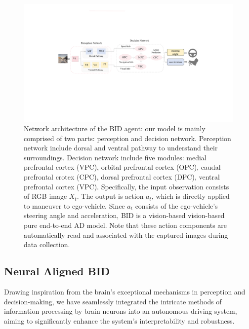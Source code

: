 \begin{figure}[t]
	\centering
	\includegraphics[width=\linewidth]{fig/net.pdf}
	\caption{Network architecture of the BID agent:
	our model is mainly comprised of two parts: perception and decision network.
	Perception network include dorsal and ventral pathway to understand their surroundings.
	Decision network include five modules: medial prefrontal cortex (VPC), orbital prefrontal cortex (OPC), caudal prefrontal crotex (CPC), dorsal prefrontal cortex (DPC), ventral prefrontal cortex (VPC).
	Specifically, the input observation consists of RGB image $X_t$.
	The output is action $a_t$, which is directly applied to maneuver to ego-vehicle.
	Since $a_t$ consists of the ego-vehicle's steering angle and acceleration, BID is a vision-based vision-based pure end-to-end AD model.
	Note that these action components are automatically read and associated with the captured images during data collection.
	}
	\label{fig:fig2}
\end{figure}

\subsection{Neural Aligned BID}
\hspace{1pc}Drawing inspiration from the brain's exceptional mechanisms in perception and decision-making, we have seamlessly integrated the intricate methods of information processing by brain neurons into an autonomous driving system, aiming to significantly enhance the system's interpretability and robustness.

